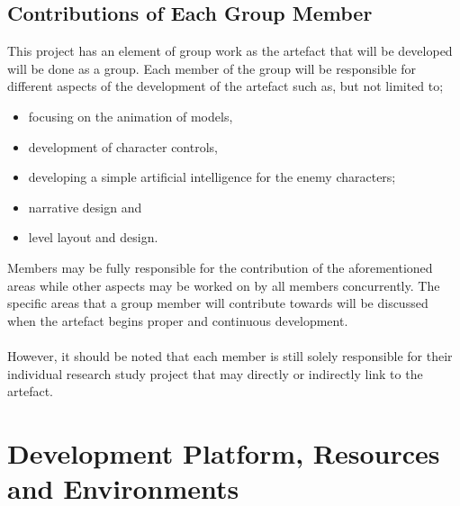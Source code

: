 \subsection{Contributions of Each Group Member}
This project has an element of group work as the artefact that will be developed will be done as a group. Each member of the group will be responsible for different aspects of the development of the artefact such as, but not limited to;
\begin{itemize}
\item focusing on the animation of models, 
\item development of character controls, 
\item developing a simple artificial intelligence for the enemy characters;
\item narrative design and 
\item level layout and design. 
\end{itemize}
Members may be fully responsible for the contribution of the aforementioned areas while other aspects may be worked on by all members concurrently. The specific areas that a group member will contribute towards will be discussed when the artefact begins proper and continuous development.
\\\\
However, it should be noted that each member is still solely responsible for their individual research study project that may directly or indirectly link to the artefact.



\section{Development Platform, Resources and Environments}
